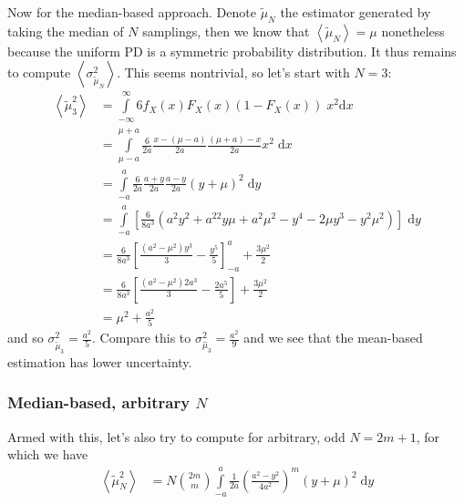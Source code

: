 \documentclass[10pt]{article}
\newcommand{\expvalue}[1]{\left<#1\right>}
\begin{document}
Now for the median-based approach. Denote $\tilde{\mu}_N$ the estimator
generated by taking the median of $N$ samplings, then we know that
$\expvalue{\tilde{\mu}_N} = \mu$ nonetheless because the uniform PD is a
symmetric probability distribution. It thus remains to compute
$\expvalue{\sigma^2_{\tilde{\mu}_N}}$. This seems nontrivial, so let's start
with $N=3$:
\begin{align}
    \expvalue{\tilde{\mu}_3^2} &= \int\limits_{-\infty}^{\infty}
        6f_X(x)F_X(x)\left( 1 - F_X(x) \right)\;x^2 \mathrm{d}x\\
        &= \int\limits_{\mu-a}^{\mu+a}
            \frac{6}{2a}\frac{x - (\mu - a)}{2a}\frac{(\mu + a) - x}{2a}x^2
            \;\mathrm{d}x\\
        &= \int\limits_{-a}^{a}\frac{6}{2a}\frac{a + y}{2a}\frac{a - y}{2a}
            (y + \mu)^2\;\mathrm{d}y\\
        &= \int\limits_{-a}^a\left[
                \frac{6}{8a^3}\left(
                    a^2y^2 + a^22y\mu + a^2\mu^2 - y^4 - 2\mu y^3 - y^2\mu^2
                \right)
            \right]\;\mathrm{d}y\\
        &= \frac{6}{8a^3}\left[
                \frac{(a^2 - \mu^2)y^3}{3} - \frac{y^5}{5}
            \right]_{-a}^a + \frac{3\mu^2}{2}\\
        &= \frac{6}{8a^3}\left[
            \frac{\left(
                a^2 - \mu^2
            \right) 2a^3}{3} - \frac{2a^5}{5}
        \right] + \frac{3\mu^2}{2}\\
        &= \mu^2 + \frac{a^2}{5}
\end{align}
and so $\sigma_{\tilde{\mu}_3}^2 = \frac{a^2}{5}$. Compare this to
$\sigma_{\hat{\mu}_3}^2 = \frac{a^2}{9}$ and we see that the mean-based
estimation has lower uncertainty.

\subsubsection{Median-based, arbitrary $N$}

Armed with this, let's also try to compute for arbitrary, odd $N=2m+1$, for which we
have
\begin{align}
    \expvalue{\tilde{\mu}_N^2}
        &=
            N\binom{2m}{m}\int\limits_{-a}^{a}\frac{1}{2a}
                \left( \frac{a^2 - y^2}{4a^2} \right)^m(y+\mu)^2
            \;\mathrm{d}y
\end{align}
\end{document}
